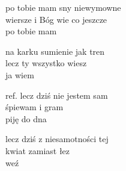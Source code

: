 \begin{text}
    po tobie mam sny niewymowne\\
    wiersze i Bóg wie co jeszcze\\
    po tobie mam

    na karku sumienie jak tren\\
    lecz ty wszystko wiesz\\
    ja wiem

    ref. lecz dziś nie jestem sam\\
    śpiewam i gram\\
    piję do dna

    lecz dziś z niesamotności tej\\
    kwiat zamiast łez\\
    weź
\end{text}
\begin{chord}

\end{chord}